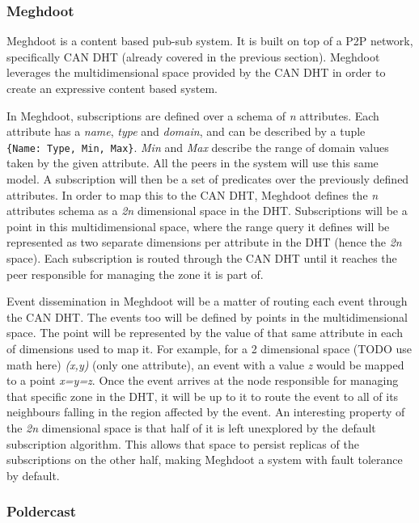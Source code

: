 \subsubsection{Meghdoot}\label{meghdoot}

Meghdoot \cite{Gupta2004} is a content based pub-sub system.
It is built on top of a P2P network, specifically CAN DHT (already
covered in the previous section). Meghdoot leverages the
multidimensional space provided by the CAN DHT in order to create an
expressive content based system.

In Meghdoot, subscriptions are defined over a schema of \emph{n}
attributes. Each attribute has a \emph{name}, \emph{type} and
\emph{domain}, and can be described by a tuple
\texttt{\{Name:\ Type,\ Min,\ Max\}}. \emph{Min} and \emph{Max} describe
the range of domain values taken by the given attribute. All the peers
in the system will use this same model. A subscription will then be a
set of predicates over the previously defined attributes. In order to
map this to the CAN DHT, Meghdoot defines the \emph{n} attributes schema
as a \emph{2n} dimensional space in the DHT. Subscriptions will be a
point in this multidimensional space, where the range query it defines
will be represented as two separate dimensions per attribute in the DHT
(hence the \emph{2n} space). Each subscription is routed through the CAN
DHT until it reaches the peer responsible for managing the zone it is
part of.

Event dissemination in Meghdoot will be a matter of routing each event
through the CAN DHT. The events too will be defined by points in the
multidimensional space. The point will be represented by the value of
that same attribute in each of dimensions used to map it. For example,
for a 2 dimensional space (TODO use math here) \emph{(x,y)} (only one attribute), an event
with a value \emph{z} would be mapped to a point \emph{x=y=z}. Once the
event arrives at the node responsible for managing that specific zone in
the DHT, it will be up to it to route the event to all of its neighbours
falling in the region affected by the event. An interesting property of
the \emph{2n} dimensional space is that half of it is left unexplored by
the default subscription algorithm. This allows that space to persist
replicas of the subscriptions on the other half, making Meghdoot a
system with fault tolerance by default.

\subsubsection{Poldercast}\label{poldercast}

